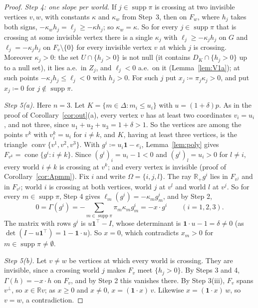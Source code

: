 \documentclass[11pt]{article}
\newcommand{\R}{\mathbb{R}}
\newcommand{\one}{\mathbf{1}}
\DeclareMathOperator{\conv}{conv}
\DeclareMathOperator{\cone}{cone}
\DeclareMathOperator{\supp}{supp}
\theoremstyle{plain}
\theoremstyle{definition}
\theoremstyle{remark}
\begin{document}
\begin{proof}
\emph{Step 4: one slope per world.} If $j\in\supp\pi$ is crossing at two invisible
vertices $v,w$, with constants $\kappa$ and $\kappa_w$ from Step~3, then on $F_w$, where
$h_j$ takes both signs, $-\kappa_wh_j=\ell_j\ge-\kappa h_j$; so $\kappa_w=\kappa$. So for
every $j\in\supp\pi$ that is crossing at some invisible vertex there is a single
$\kappa_j$ with $\ell_j\ge-\kappa_jh_j$ on $G$ and $\ell_j=-\kappa_jh_j$ on $F_v\setminus
\{0\}$ for every invisible vertex $v$ at which $j$ is crossing. Moreover $\kappa_j>0$:
the set $U\cap\{h_j>0\}$ is not null (it contains $D_K\cap\{h_j>0\}$ up to a null set),
it lies a.e.\ in $Z_j$, and $\ell_j<0$ a.e.\ on it (Lemma~\ref{lem:V1a}); at such points
$-\kappa_jh_j\le\ell_j<0$ with $h_j>0$. For such $j$ put $x_j\coloneqq\pi_j\kappa_j>0$,
and put $x_j\coloneqq0$ for $j\notin\supp\pi$.

\emph{Step 5(a).} Here $n=3$. Let $K=\{m\in\Delta:m_i\le u_i\}$ with $u=(1+\delta)p$. As in the
proof of Corollary~\ref{cor:out}(a), every vertex $v$ has at least two coordinates
$v_i=u_i$, and not three, since $u_1+u_2+u_3=1+\delta>1$. So the vertices are among the
points $v^k$ with $v^k_i=u_i$ for $i\ne k$, and $K$, having at least three vertices, is
the triangle $\conv\{v^1,v^2,v^3\}$. With $g^i\coloneqq u_i\one-e_i$,
Lemma~\ref{lem:poly} gives $F_{v^k}=\cone\{g^i:i\ne k\}$. Since $(g^i)_i=u_i-1<0$ and
$(g^i)_l=u_i>0$ for $l\ne i$, every world $i\ne k$ is crossing at $v^k$; and every vertex
is invisible (proof of Corollary~\ref{cor:Apmm}). Fix $i$ and write $\Omega=\{i,j,l\}$.
The ray $\R_+g^i$ lies in $F_{v^j}$ and in $F_{v^l}$; world $i$ is crossing at both
vertices, world $j$ at $v^l$ and world $l$ at $v^j$. So for every $m\in\supp\pi$, Step 4
gives $\ell_m(g^i)=-\kappa_mg^i_m$, and by Step 2,
\[
  0=\Gamma(g^i)=-\sum_{m\in\supp\pi}\pi_m\kappa_mg^i_m=-x\cdot g^i\qquad(i=1,2,3).
\]
The matrix with rows $g^i$ is $u\one^\top-I$, whose determinant is $\one\cdot u-1=\delta
\neq0$ (as $\det(I-u\one^\top)=1-\one\cdot u$). So $x=0$, which contradicts $x_m>0$ for
$m\in\supp\pi\neq\emptyset$.

\emph{Step 5(b).} Let $v\neq w$ be vertices at which every world is crossing. They are
invisible, since a crossing world $j$ makes $F_v$ meet $\{h_j>0\}$. By Steps 3 and 4,
$\Gamma(h)=-x\cdot h$ on $F_v$, and by Step 2 this vanishes there. By Step 3(iii), $F_v$
spans $v^\perp$, so $x\in\R v$; as $x\ge0$ and $x\neq0$, $x=(\one\cdot x)\,v$. Likewise
$x=(\one\cdot x)\,w$, so $v=w$, a contradiction.
\end{proof}
\end{document}
